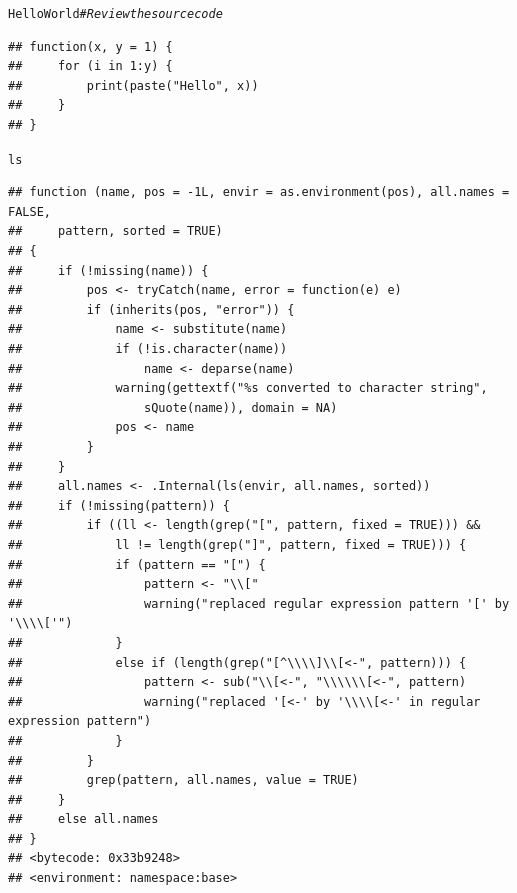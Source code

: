 \documentclass{beamer}\usepackage[]{graphicx}\usepackage[]{color}
\makeatletter
\newcommand{\hlcom}[1]{\textcolor[rgb]{0.678,0.584,0.686}{\textit{#1}}}%
\newcommand{\hlstd}[1]{\textcolor[rgb]{0.345,0.345,0.345}{#1}}%
\newenvironment{kframe}{%
 \def\at@end@of@kframe{}%
 \ifinner\ifhmode%
  \def\at@end@of@kframe{\end{minipage}}%
  \begin{minipage}{\columnwidth}%
 \fi\fi%
 \def\FrameCommand##1{\hskip\@totalleftmargin \hskip-\fboxsep
 \colorbox{shadecolor}{##1}\hskip-\fboxsep
     \hskip-\linewidth \hskip-\@totalleftmargin \hskip\columnwidth}%
 \MakeFramed {\advance\hsize-\width
   \@totalleftmargin\z@ \linewidth\hsize
   \@setminipage}}%
 {\par\unskip\endMakeFramed%
 \at@end@of@kframe}
\newenvironment{knitrout}{}{} %
\makeatother
\begin{document}
\begin{frame}
\begin{knitrout}\scriptsize
{}\color{fgcolor}\begin{kframe}
\begin{alltt}
\hlstd{HelloWorld}  \hlcom{# Review the source code}
\end{alltt}
\begin{verbatim}
## function(x, y = 1) {
##     for (i in 1:y) {
##         print(paste("Hello", x))
##     }
## }
\end{verbatim}
\begin{alltt}
\hlstd{ls}
\end{alltt}
\begin{verbatim}
## function (name, pos = -1L, envir = as.environment(pos), all.names = FALSE, 
##     pattern, sorted = TRUE) 
## {
##     if (!missing(name)) {
##         pos <- tryCatch(name, error = function(e) e)
##         if (inherits(pos, "error")) {
##             name <- substitute(name)
##             if (!is.character(name)) 
##                 name <- deparse(name)
##             warning(gettextf("%s converted to character string", 
##                 sQuote(name)), domain = NA)
##             pos <- name
##         }
##     }
##     all.names <- .Internal(ls(envir, all.names, sorted))
##     if (!missing(pattern)) {
##         if ((ll <- length(grep("[", pattern, fixed = TRUE))) && 
##             ll != length(grep("]", pattern, fixed = TRUE))) {
##             if (pattern == "[") {
##                 pattern <- "\\["
##                 warning("replaced regular expression pattern '[' by  '\\\\['")
##             }
##             else if (length(grep("[^\\\\]\\[<-", pattern))) {
##                 pattern <- sub("\\[<-", "\\\\\\[<-", pattern)
##                 warning("replaced '[<-' by '\\\\[<-' in regular expression pattern")
##             }
##         }
##         grep(pattern, all.names, value = TRUE)
##     }
##     else all.names
## }
## <bytecode: 0x33b9248>
## <environment: namespace:base>
\end{verbatim}
\end{kframe}
\end{knitrout}
\end{frame}
\end{document}
